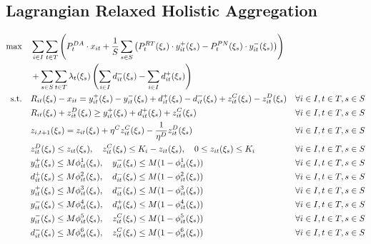 \documentclass[10pt]{article}
\begin{document}
\subsection{Lagrangian Relaxed Holistic Aggregation}
\begin{subequations}
    \begin{align} 
        \text{max} \quad &\sum_{i\in I}\sum_{t\in T}\left(P_t^{DA} \cdot x_{it} + \frac{1}{S}\sum_{s \in S}\left(P_t^{RT}(\xi_s) \cdot y^+_{it}(\xi_s) - P_t^{PN}(\xi_s) \cdot y^-_{it}(\xi_s)\right) \right)\\
        &+ \sum_{s \in S} \sum_{t \in T} \lambda_{t}(\xi_s) \left( \sum_{i\in I} d^-_{it}(\xi_s) - \sum_{i\in I} d^+_{it}(\xi_s) \right)& \notag \\
        \text{s.t.} \quad 
        & R_{it}(\xi_s) - x_{it} = y_{it}^{+}(\xi_s) - y_{it}^{-}(\xi_s) + d^+_{it}(\xi_s) - d^-_{it}(\xi_s) + z^C_{it}(\xi_s) - z^D_{it}(\xi_s) & \forall i \in I, t \in T, s \in S\\
        & R_{it}(\xi_s) + z^D_{it}(\xi_s) \geq y^+_{it}(\xi_s) + d^+_{it}(\xi_s) + z^C_{it}(\xi_s) & \forall i \in I, t \in T, s \in S\\
        & z_{i,t+1}(\xi_s) = z_{it}(\xi_s) + \eta^C z^C_{it}(\xi_s) - \frac{1}{\eta^D} z^D_{it}(\xi_s) & \forall i \in I, t \in T, s \in S \\
        & z^D_{it}(\xi_s) \le z_{it}(\xi_s), \quad z^C_{it}(\xi_s) \le K_i - z_{it}(\xi_s), \quad 0 \leq z_{it}(\xi_s) \leq K_i & \forall i \in I, t \in T, s \in S\\
        & y^+_{it}(\xi_s) \leq M \phi^1_{it}(\xi_s), \quad y^-_{it}(\xi_s) \leq M (1 - \phi^1_{it}(\xi_s)) & \forall i \in I, t \in T, s \in S \\
        & d^+_{it}(\xi_s) \leq M \phi^2_{it}(\xi_s), \quad d^-_{it}(\xi_s) \leq M (1 - \phi^2_{it}(\xi_s)) & \forall i \in I, t \in T, s \in S \\
        & y^+_{it}(\xi_s) \leq M \phi^3_{it}(\xi_s), \quad d^-_{it}(\xi_s) \leq M (1 - \phi^3_{it}(\xi_s)) & \forall i \in I, t \in T, s \in S \\
        & y^-_{it}(\xi_s) \leq M \phi^4_{it}(\xi_s), \quad d^+_{it}(\xi_s) \leq M (1 - \phi^4_{it}(\xi_s)) & \forall i \in I, t \in T, s \in S \\
        & y^-_{it}(\xi_s) \leq M \phi^5_{it}(\xi_s), \quad z^C_{it}(\xi_s) \leq M (1 - \phi^5_{it}(\xi_s)) & \forall i \in I, t \in T, s \in S \\
        & d^-_{it}(\xi_s) \leq M \phi^6_{it}(\xi_s), \quad z^C_{it}(\xi_s) \leq M (1 - \phi^6_{it}(\xi_s)) & \forall i \in I, t \in T, s \in S 
    \end{align}
\end{subequations}
\end{document}
